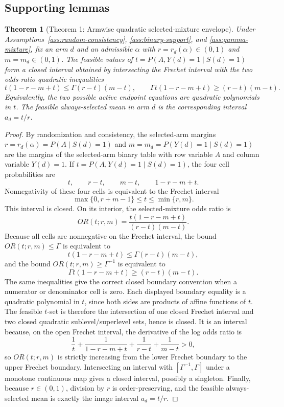 \documentclass[11pt]{article}
\theoremstyle{definition}
\theoremstyle{plain}
\newtheorem{theorem}{Theorem}
\theoremstyle{remark}
\begin{document}
\subsection*{Supporting lemmas}
\begin{theorem}[Theorem 1: Armwise quadratic selected-mixture envelope]\label{thm:arm-quadratic}
Under Assumptions~\ref{ass:random-consistency}, \ref{ass:binary-support}, and \ref{ass:gamma-mixture}, fix an arm \(d\) and an admissible \(\alpha\) with \(r=r_d(\alpha)\in(0,1)\) and \(m=m_d\in(0,1)\).  The feasible values of \(t=P(A,Y(d)=1\mid S(d)=1)\) form a closed interval obtained by intersecting the Frechet interval with the two odds-ratio quadratic inequalities
\[
  t(1-r-m+t)\le \Gamma(r-t)(m-t),
  \qquad
  \Gamma t(1-r-m+t)\ge (r-t)(m-t).
\]
Equivalently, the two possible active endpoint equations are quadratic polynomials in \(t\).  The feasible always-selected mean in arm \(d\) is the corresponding interval \(a_d=t/r\).
\end{theorem}
\begin{proof}
By randomization and consistency, the selected-arm margins \(r=r_d(\alpha)=P(A\mid S(d)=1)\) and \(m=m_d=P(Y(d)=1\mid S(d)=1)\) are the margins of the selected-arm binary table with row variable \(A\) and column variable \(Y(d)=1\).  If \(t=P(A,Y(d)=1\mid S(d)=1)\), the four cell probabilities are
\[
  t,\qquad r-t,\qquad m-t,\qquad 1-r-m+t.
\]
Nonnegativity of these four cells is equivalent to the Frechet interval
\[
  \max\{0,r+m-1\}\le t\le \min\{r,m\}.
\]
This interval is closed.  On its interior, the selected-mixture odds ratio is
\[
  OR(t;r,m)=\frac{t(1-r-m+t)}{(r-t)(m-t)}.
\]
Because all cells are nonnegative on the Frechet interval, the bound \(OR(t;r,m)\le \Gamma\) is equivalent to
\[
  t(1-r-m+t)\le \Gamma(r-t)(m-t),
\]
and the bound \(OR(t;r,m)\ge \Gamma^{-1}\) is equivalent to
\[
  \Gamma t(1-r-m+t)\ge (r-t)(m-t).
\]
The same inequalities give the correct closed boundary convention when a numerator or denominator cell is zero.  Each displayed boundary equality is a quadratic polynomial in \(t\), since both sides are products of affine functions of \(t\).  The feasible \(t\)-set is therefore the intersection of one closed Frechet interval and two closed quadratic sublevel/superlevel sets, hence is closed.  It is an interval because, on the open Frechet interval, the derivative of the log odds ratio is
\[
  \frac{1}{t}+\frac{1}{1-r-m+t}+\frac{1}{r-t}+\frac{1}{m-t}>0,
\]
so \(OR(t;r,m)\) is strictly increasing from the lower Frechet boundary to the upper Frechet boundary.  Intersecting an interval with \([\Gamma^{-1},\Gamma]\) under a monotone continuous map gives a closed interval, possibly a singleton.  Finally, because \(r\in(0,1)\), division by \(r\) is order-preserving, and the feasible always-selected mean is exactly the image interval \(a_d=t/r\).
\end{proof}
\end{document}
